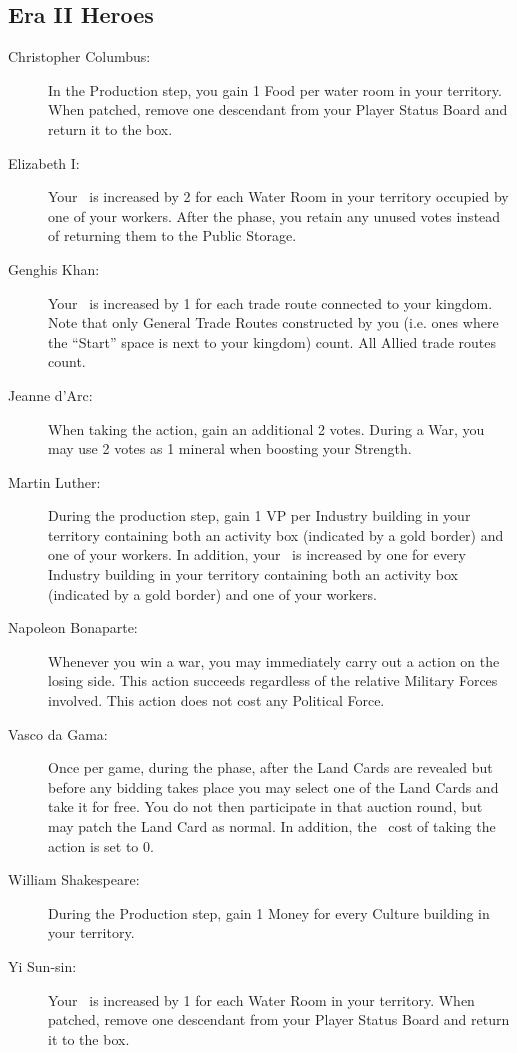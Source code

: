 \documentclass[10pt,twocolumn]{article}
\begin{document}
\begin{appendices}
\subsection{Era II Heroes}
\begin{description}
\item[Christopher Columbus:] In the Production step, you gain 1 Food per water room in your territory. When patched, remove one descendant from your Player Status Board and return it to the box.
\item[Elizabeth I:] Your \mil\ is increased by 2 for each Water Room in your territory occupied by one of your workers. After the  phase, you retain any unused votes instead of returning them to the Public Storage.
\item[Genghis Khan:] Your \mil\ is increased by 1 for each trade route connected to your kingdom. Note that only General Trade Routes constructed by you (i.e. ones where the ``Start'' space is next to your kingdom) count. All Allied trade routes count.
\item[Jeanne d'Arc:] When taking the  action, gain an additional 2 votes. During a War, you may use 2 votes as 1 mineral when boosting your Strength.
\item[Martin Luther:] During the production step, gain 1 VP per Industry building in your territory containing both an activity box (indicated by a gold border) and one of your workers. In addition, your \mil\ is increased by one for every Industry building in your territory containing both an activity box (indicated by a gold border) and one of your workers.
\item[Napoleon Bonaparte:] Whenever you win a war, you may immediately carry out a  action on the losing side. This action succeeds regardless of the relative Military Forces involved. This action does not cost any Political Force.
\item[Vasco da Gama:] Once per game, during the  phase, after the Land Cards are revealed but before any bidding takes place you may select one of the Land Cards and take it for free. You do not then participate in that auction round, but may patch the Land Card as normal. In addition, the \polf\ cost of taking the  action is set to 0.
\item[William Shakespeare:] During the Production step, gain 1 Money for every Culture building in your territory.
\item[Yi Sun-sin:] Your \mil\ is increased by 1 for each Water Room in your territory. When patched, remove one descendant from your Player Status Board and return it to the box.
\end{description}

\end{appendices}
\end{document}
